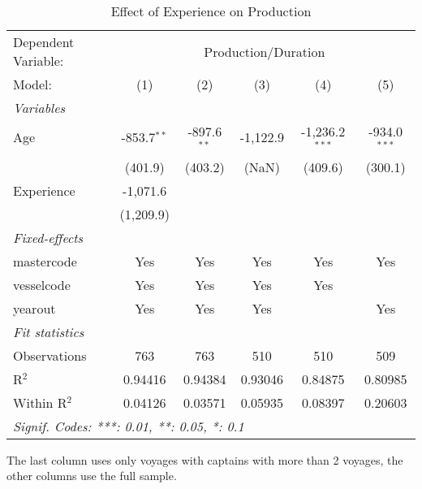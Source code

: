 
\begin{table}[htbp]
   \caption{\label{tab:age} Effect of Experience on Production}
   \centering
   \begin{tabular}{lccccc}
      \tabularnewline \midrule \midrule
      Dependent Variable: & \multicolumn{5}{c}{Production/Duration}\\
      Model:       & (1)           & (2)           & (3)      & (4)              & (5)\\  
      \midrule
      \emph{Variables}\\
      Age          & -853.7$^{**}$ & -897.6$^{**}$ & -1,122.9 & -1,236.2$^{***}$ & -934.0$^{***}$\\   
                   & (401.9)       & (403.2)       & (NaN)    & (409.6)          & (300.1)\\   
      Experience   & -1,071.6      &               &          &                  &   \\   
                   & (1,209.9)     &               &          &                  &   \\   
      \midrule
      \emph{Fixed-effects}\\
      mastercode   & Yes           & Yes           & Yes      & Yes              & Yes\\  
      vesselcode   & Yes           & Yes           & Yes      & Yes              & \\  
      yearout      & Yes           & Yes           & Yes      &                  & Yes\\  
      \midrule
      \emph{Fit statistics}\\
      Observations & 763           & 763           & 510      & 510              & 509\\  
      R$^2$        & 0.94416       & 0.94384       & 0.93046  & 0.84875          & 0.80985\\  
      Within R$^2$ & 0.04126       & 0.03571       & 0.05935  & 0.08397          & 0.20603\\  
      \midrule \midrule
      \multicolumn{6}{l}{\emph{Signif. Codes: ***: 0.01, **: 0.05, *: 0.1}}\\
   \end{tabular}
   
   \par \raggedright 
   The last column uses only voyages with captains with more than 2 voyages, the other columns use the full sample. 
\end{table}


